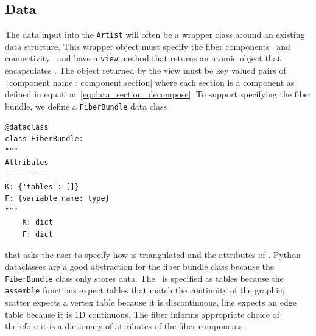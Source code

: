 \documentclass[../main.tex]{subfiles}
\begin{document}
\subsection{Data \dtotal}
\label{sec:code_data}
The data input into the \texttt{Artist} will often be a wrapper class around an existing data structure. This wrapper object must specify the fiber components \dfiber\ and connectivity \dbase\ and have a \texttt{view} method that returns an atomic object that encapsulates \dsection. The object returned by the view must be key valued pairs of \texttt|{component name : component section}| where each section is a component as defined in equation~\ref{eq:data_section_decompose}. To support specifying the fiber bundle, we define a \texttt{FiberBundle} data class\cite{DataclassesDataClasses}

\begin{verbatim}
@dataclass
class FiberBundle:
"""
Attributes
----------
K: {'tables': []}
F: {variable name: type}
"""
    K: dict 
    F: dict
\end{verbatim}

that asks the user to specify how \dbase is triangulated and the attributes of \dfiber. Python dataclasses are a good abstraction for the fiber bundle class because the \texttt{FiberBundle} class only stores data. The \dbase\ is specified as tables because the \texttt{assemble} functions expect tables that match the continuity of the graphic; scatter expects a vertex table because it is discontinuous, line expects an edge table because it is 1D continuous. The fiber informs appropriate choice of \vchannel\, therefore it is a dictionary of attributes of the fiber components. 
\end{document}
